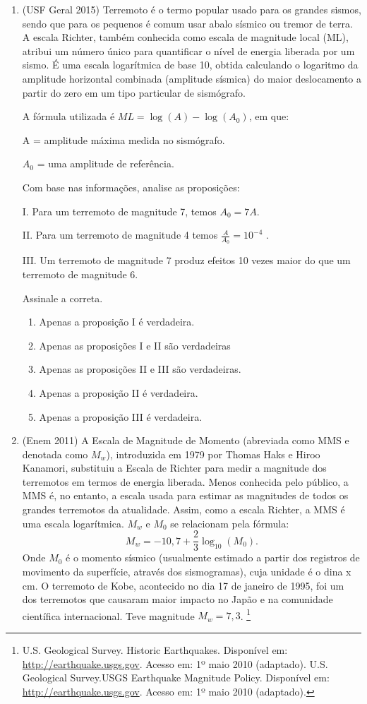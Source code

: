 \begin{enumerate}
   
\item \label{Exer7} (USF Geral 2015) Terremoto é o termo popular usado para os grandes sismos, sendo que para os pequenos é comum 
usar 
abalo sísmico ou tremor de terra. A escala Richter, também conhecida como escala de magnitude local (ML), atribui um 
número único para quantificar o nível de energia liberada por um sismo. É uma escala logarítmica de base 10, obtida 
calculando o logaritmo da amplitude horizontal combinada (amplitude sísmica) do maior deslocamento a partir do zero em 
um tipo particular de sismógrafo. 

A fórmula utilizada é $ML = \log(A) - \log (A_0)$, em que: 

A = amplitude máxima medida no sismógrafo. 

$A_0$ = uma amplitude de referência. 

Com base nas informações, analise as proposições: 

I. Para um terremoto de magnitude 7, temos $A_0 = 7A$. 

II. Para um terremoto de magnitude 4 temos $\frac{A}{A_0}=10^{-4}$ .
 
III. Um terremoto de magnitude 7 produz efeitos 10 vezes maior do que um terremoto de magnitude 6. 

Assinale a correta.
\begin{enumerate}
    \item Apenas a proposição I é verdadeira.
    \item Apenas as proposições I e II são verdadeiras
	\item Apenas as proposições II e III são verdadeiras.
	\item Apenas a proposição II é verdadeira.
	\item Apenas a proposição III é verdadeira.
\end{enumerate}


\item \label{Exer8} (Enem 2011) A Escala de Magnitude de Momento (abreviada como MMS e denotada como $M_w$), introduzida em 1979 por Thomas 
Haks e Hiroo Kanamori, substituiu a Escala de Richter para medir a magnitude dos terremotos em termos de energia 
liberada. Menos conhecida pelo público, a MMS é, no entanto, a escala usada para estimar as magnitudes de todos os 
grandes terremotos da atualidade. Assim, como a escala Richter, a MMS é uma escala logarítmica. 
$M_w$ e $M_0$ se relacionam pela fórmula:
$$
M_w = - 10,7 + \frac{2}{3}\log_{ 10 }(M_0).
$$
Onde $M_0$ é o momento sísmico (usualmente estimado a partir dos registros de movimento da superfície, através dos 
sismogramas), cuja unidade é o dina x cm. O terremoto de Kobe, acontecido no dia 17 de janeiro de 1995, foi um dos 
terremotos que causaram maior impacto no Japão e na comunidade científica internacional. Teve magnitude $M_w = 7,3$.
\footnote{U.S. Geological Survey. Historic Earthquakes.
Disponível em: \url{http://earthquake.usgs.gov}. 
Acesso em: 1º maio 2010 (adaptado).
U.S. Geological Survey.USGS Earthquake Magnitude Policy.
Disponível em: \url{http://earthquake.usgs.gov}. 
Acesso em: 1º maio 2010 (adaptado).}


\end{enumerate}
